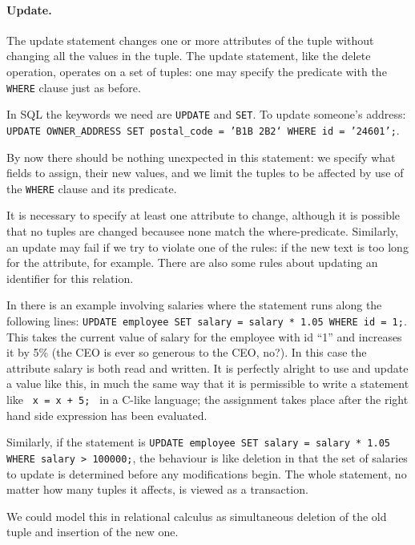 \paragraph{Update.} 
The update statement changes one or more attributes of the tuple without changing all the values in the tuple. The update statement, like the delete operation, operates on a set of tuples: one may specify the predicate with the \texttt{WHERE} clause just as before. 

In SQL the keywords we need are \texttt{UPDATE} and \texttt{SET}.  To update someone's address: \texttt{UPDATE OWNER\_ADDRESS SET postal\_code = 'B1B 2B2` WHERE id = '24601';}. 

By now there should be nothing unexpected in this statement: we specify what fields to assign, their new values, and we limit the tuples to be affected by use of the \texttt{WHERE} clause and its predicate. 

It is necessary to specify at least one attribute to change, although it is possible that no tuples are changed becausee none match the where-predicate. Similarly, an update may fail if we try to violate one of the rules: if the new text is too long for the attribute, for example. There are also some rules about updating an identifier for this relation. 

In \cite{dsc} there is an example involving salaries where the statement runs along the following lines: \texttt{UPDATE employee SET salary = salary * 1.05 WHERE id = 1;}. This takes the current value of salary for the employee with id ``1'' and increases it by 5\% (the CEO is ever so generous to the CEO, no?). In this case the attribute salary is both read and written. It is perfectly alright to use and update a value like this, in much the same way that it is permissible to write a statement like \texttt{ x = x + 5; } in a C-like language; the assignment takes place after the right hand side expression has been evaluated.

Similarly, if the statement is \texttt{UPDATE employee SET salary = salary * 1.05 WHERE salary > 100000;}, the behaviour is like deletion in that the set of salaries to update is determined before any modifications begin. The whole statement, no matter how many tuples it affects, is viewed as a transaction. 


We could model this in relational calculus as simultaneous deletion of the old tuple and insertion of the new one. 





